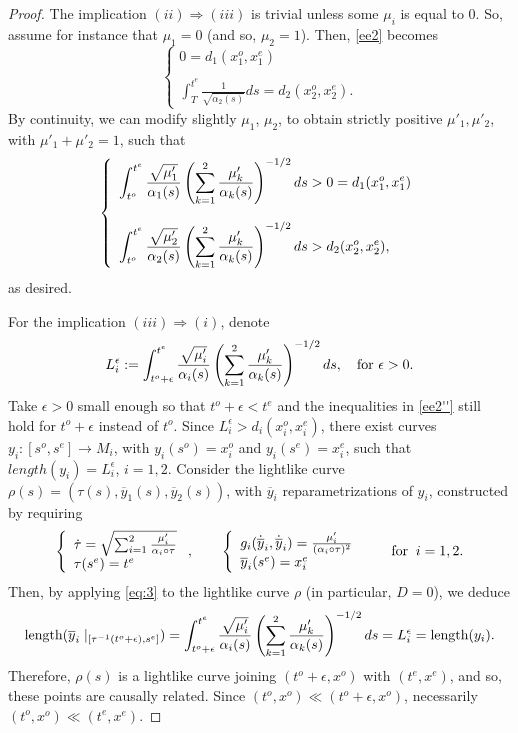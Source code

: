 \begin{proof}
The implication $(ii)\Rightarrow (iii)$ is trivial unless some $\mu_i$ is equal to $0$. So, assume for instance that $\mu_1=0$ (and so, $\mu_2=1$). Then, \eqref{ee2} becomes
\[
\left\{
  \begin{array}{l}
    0=d_1(x_1^o,x_1^e)\\
    \\
    \displaystyle \int_{T}^{t^e}\frac{1}{\sqrt{\alpha_2(s)}}ds=d_2(x_2^o,x_2^e).
  \end{array}
\right.
  \]
  By continuity, we can modify slightly $\mu_1$, $\mu_2$, to obtain strictly positive $\mu'_1,\mu'_2$, with $\mu'_1+\mu'_2=1$, such that
 \[
    \left\{
      \begin{array}{l}\displaystyle\int_{t^{o}}^{t^{e}} \frac{\sqrt{\mu_{1}'}}{\alpha_{1}(s)}\left(\sum_{k=1}^{2} \frac{\mu_{k}'}{\alpha_{k}(s)} \right)^{-1/2}ds>0= d_1(x_1^o,x_1^e)\\
      \\
      \displaystyle\int_{t^{o}}^{t^{e}} \frac{\sqrt{\mu_{2}'}}{\alpha_{2}(s)}\left(\sum_{k=1}^{2} \frac{\mu_{k}'}{\alpha_{k}(s)} \right)^{-1/2}ds> d_2(x_2^o,x_2^e),
      \end{array}\right.
    \]
as desired.


For the implication $(iii) \Rightarrow (i)$, denote
  \[
L^\epsilon_i:=\int_{t^o+\epsilon}^{t^e} \frac{\sqrt{\mu_{i}'}}{\alpha_{i}(s)}\left(\sum_{k=1}^{2} \frac{\mu_{k}'}{\alpha_{k}(s)} \right)^{-1/2}ds,\quad\hbox{for $\epsilon>0$.}
    \]
 Take $\epsilon>0$ small enough so that $t^o+\epsilon<t^e$ and the inequalities in \eqref{ee2''} still hold for $t^o+\epsilon$ instead of $t^o$. Since $L_i^{\epsilon}>d_i(x_i^o,x_i^e)$, there exist curves $y_i:[s^o,s^e]\rightarrow M_i$, with $y_{i}(s^{o})=x_{i}^{o}$ and $y_{i}(s^{e})=x^{e}_{i}$, such that $length(y_{i})=L^\epsilon_{i}$, $i=1,2$. Consider the lightlike curve
$\rho(s)=(\tau(s),\overline{y}_{1}(s),\overline{y}_{2}(s))$,
with $\overline{y}_{i}$ reparametrizations of $y_{i}$,
constructed by
requiring
\[
\left\{\begin{array}{l}\dot{\tau}=\sqrt{\sum_{i=1}^{2}\frac{\mu_{i}'}{\alpha_{i}\circ\tau}}
\\ \tau(s^{e})=t^{e}
\end{array}\right.,\qquad
\left\{\begin{array}{l}g_{i}(\dot{\overline{y}}_{i},\dot{\overline{y}}_{i})=\frac{\mu_{i}'}{(\alpha_{i}\circ
\tau)^{2}} \\
\overline{y}_{i}(s^{e})=x^{e}_{i}\end{array}\right.
\qquad\hbox{for}\;\; i=1,2.
\]
Then, by applying \eqref{eq:3} to the lightlike curve $\rho$ (in particular, $D=0$), we deduce
\[
\hbox{length}(\overline{y}_{i}\mid_{[\tau^{-1}(t^o+\epsilon),s^{e}]})=\int_{t^o+\epsilon}^{t^{e}} \frac{\sqrt{\mu_{i}'}}{\alpha_{i}(s)}\left(\sum_{k=1}^{2} \frac{\mu_{k}'}{\alpha_{k}(s)} \right)^{-1/2}ds
=L^\epsilon_{i}=\hbox{length}(y_{i}).
\]
Therefore, $\rho(s)$ is a lightlike curve joining $(t^o+\epsilon,x^{o})$ with
$(t^{e},x^{e})$, and so, these points are causally related. Since $(t^o,x^o)\ll (t^o+\epsilon,x^o)$, necessarily $(t^o,x^o)\ll (t^{e},x^{e})$.


\end{proof}
